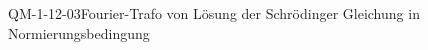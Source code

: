 
\begin{REM}{QM-1-12-03}{Fourier-Trafo von Lösung der Schrödinger Gleichung in Normierungsbedingung}
\end{REM}
